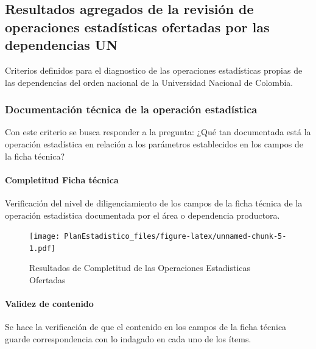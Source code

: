 \documentclass[
]{book}
\begin{document}
\hypertarget{resultados-agregados-de-la-revisiuxf3n-de-operaciones-estaduxedsticas-ofertadas-por-las-dependencias-un}{%
\subsection{Resultados agregados de la revisión de operaciones estadísticas ofertadas por las dependencias UN}\label{resultados-agregados-de-la-revisiuxf3n-de-operaciones-estaduxedsticas-ofertadas-por-las-dependencias-un}}

Criterios definidos para el diagnostico de las operaciones estadísticas propias de las dependencias
del orden nacional de la Universidad Nacional de Colombia.

\hypertarget{documentaciuxf3n-tuxe9cnica-de-la-operaciuxf3n-estaduxedstica}{%
\subsubsection{Documentación técnica de la operación estadística}\label{documentaciuxf3n-tuxe9cnica-de-la-operaciuxf3n-estaduxedstica}}

Con este criterio se busca responder a la pregunta: ¿Qué tan documentada está la operación estadística en relación a los parámetros establecidos en los campos de la ficha técnica?

\hypertarget{completitud-ficha-tuxe9cnica}{%
\paragraph{Completitud Ficha técnica}\label{completitud-ficha-tuxe9cnica}}

Verificación del nivel de diligenciamiento de los campos de la ficha técnica de la operación estadística documentada por el área o dependencia productora.

\begin{figure}
\centering
\texttt{[image: PlanEstadistico\_files/figure-latex/unnamed-chunk-5-1.pdf]}
\caption{\label{fig:unnamed-chunk-5}Resultados de Completitud de las Operaciones Estadisticas Ofertadas}
\end{figure}

\hypertarget{validez-de-contenido}{%
\paragraph{Validez de contenido}\label{validez-de-contenido}}

Se hace la verificación de que el contenido en los campos de la ficha técnica guarde correspondencia con lo indagado en cada uno de los ítems.
\end{document}
